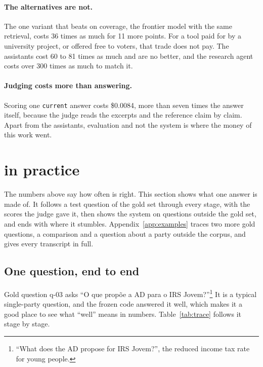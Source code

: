 \paragraph{The alternatives are not.} The one variant that beats \sysname{}
on coverage, the frontier model with the same retrieval, costs 36 times as
much for 11 more points. For a tool paid for by a university project, or
offered free to voters, that trade does not pay. The assistants cost 60 to 81
times as much and are no better, and the research agent costs over 300 times
as much to match it.

\paragraph{Judging costs more than answering.} Scoring one \texttt{current}
answer costs \$0.0084, more than seven times the answer itself, because the judge
reads the excerpts and the reference claim by claim. Apart from the
assistants, evaluation and not the system is where the money of this work
went.

\section{\sysname{} in practice} \label{sec:results-practice}

The numbers above say how often \sysname{} is right. This section shows what
one answer is made of. It follows a test question of the gold set through
every stage, with the scores the judge gave it, then shows the system on
questions outside the gold set, and ends with where it stumbles.
Appendix~\ref{app:examples} traces two more gold questions, a comparison and
a question about a party outside the corpus, and gives every transcript in
full.

\subsection{One question, end to end} \label{subsec:results-trace}

Gold question q-03 asks ``O que propõe a AD para o IRS
Jovem?''\footnote{``What does the AD propose for IRS Jovem?'', the reduced
income tax rate for young people.} It is a typical single-party question, and
the frozen code answered it well, which makes it a good place to see what
``well'' means in numbers. Table~\ref{tab:trace} follows it stage by stage.

